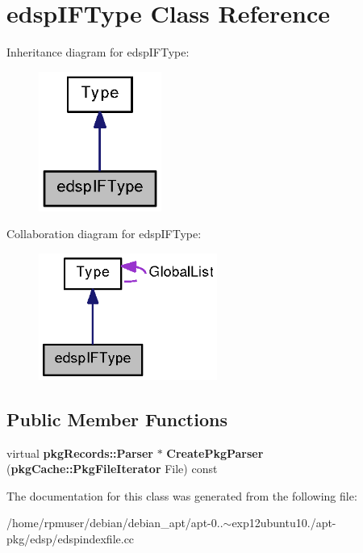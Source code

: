 \section{edsp\-I\-F\-Type \-Class \-Reference}
\label{classedspIFType}


\-Inheritance diagram for edsp\-I\-F\-Type\-:
\nopagebreak
\begin{figure}[H]
\begin{center}
\leavevmode
\includegraphics[width=114pt]{classedspIFType__inherit__graph}
\end{center}
\end{figure}


\-Collaboration diagram for edsp\-I\-F\-Type\-:
\nopagebreak
\begin{figure}[H]
\begin{center}
\leavevmode
\includegraphics[width=166pt]{classedspIFType__coll__graph}
\end{center}
\end{figure}
\subsection*{\-Public \-Member \-Functions}
\begin{DoxyCompactItemize}
\item 
virtual {\bf pkg\-Records\-::\-Parser} $\ast$ {\bfseries \-Create\-Pkg\-Parser} ({\bf pkg\-Cache\-::\-Pkg\-File\-Iterator} \-File) const \label{classedspIFType_a5c7bfcd901abdb70ec482bc768d0d7fa}

\end{DoxyCompactItemize}


\-The documentation for this class was generated from the following file\-:\begin{DoxyCompactItemize}
\item 
/home/rpmuser/debian/debian\-\_\-apt/apt-\/0..$\sim$exp12ubuntu10./apt-\/pkg/edsp/edspindexfile.\-cc\end{DoxyCompactItemize}
